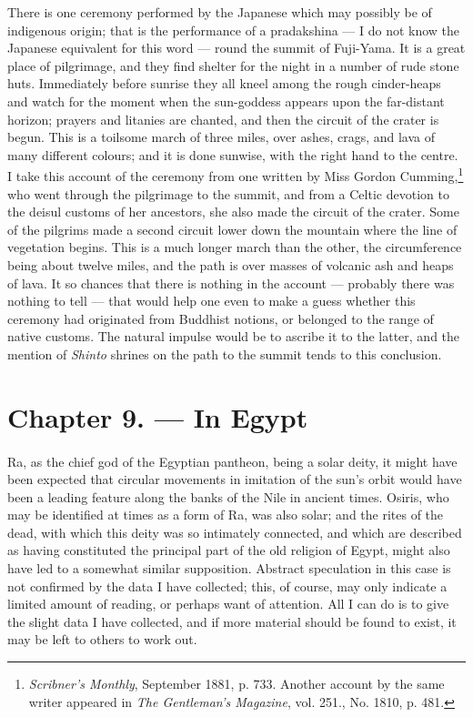 \documentclass[a4paper, 11pt, oneside, polutonikogreek, english]{article}
\begin{document}
There is one ceremony performed by the Japanese which may possibly be of indigenous origin; that is the performance of a pradakshina --- I do not know the Japanese equivalent for this word --- round the summit of Fuji-Yama. It is a great place of pilgrimage, and they find shelter for the night in a number of rude stone huts. Immediately before sunrise they all kneel among the rough cinder-heaps and watch for the moment when the sun-goddess appears upon the far-distant horizon; prayers and litanies are chanted, and then the circuit of the crater is begun. This is a toilsome march of three miles, over ashes, crags, and lava of many different colours; and it is done sunwise, with the right hand to the centre. I take this account of the ceremony from one written by Miss Gordon Cumming,\footnote{\emph{Scribner's Monthly}, September 1881, p. 733. Another account by the same writer appeared in \emph{The Gentleman's Magazine}, vol. 251., No. 1810, p. 481.} who went through the pilgrimage to the summit, and from a Celtic devotion to the deisul customs of her ancestors, she also made the circuit of the crater. Some of the pilgrims made a second circuit lower down the mountain where the line of vegetation begins. This is a much longer march than the other, the circumference being about twelve miles, and the path is over masses of volcanic ash and heaps of lava. It so chances that there is nothing in the account --- probably there was nothing to tell --- that would help one even to make a guess whether this ceremony had originated from Buddhist notions, or belonged to the range of native customs. The natural impulse would be to ascribe it to the latter, and the mention of \emph{Shinto} shrines on the path to the summit tends to this conclusion.
\clearpage
\section{Chapter 9. --- In Egypt}
\paragraph{}
Ra, as the chief god of the Egyptian pantheon, being a solar deity, it might have been expected that circular movements in imitation of the sun's orbit would have been a leading feature along the banks of the Nile in ancient times. Osiris, who may be identified at times as a form of Ra, was also solar; and the rites of the dead, with which this deity was so intimately connected, and which are described as having constituted the principal part of the old religion of Egypt, might also have led to a somewhat similar supposition. Abstract speculation in this case is not confirmed by the data I have collected; this, of course, may only indicate a limited amount of reading, or perhaps want of attention. All I can do is to give the slight data I have collected, and if more material should be found to exist, it may be left to others to work out.
\end{document}
